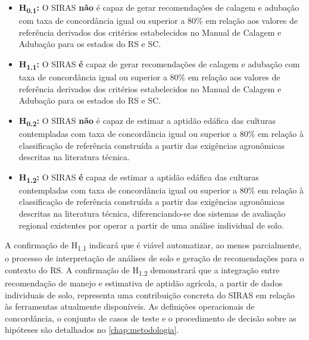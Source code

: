 \begin{itemize}

  \item \textbf{H\textsubscript{0.1}:} O SIRAS \textbf{não} é capaz de gerar
    recomendações de calagem e adubação com taxa de concordância igual ou
    superior a 80\% em relação aos valores de referência derivados dos
    critérios estabelecidos no Manual de Calagem e Adubação para os estados
    do RS e SC.

  \item \textbf{H\textsubscript{1.1}:} O SIRAS \textbf{é} capaz de gerar
    recomendações de calagem e adubação com taxa de concordância igual ou
    superior a 80\% em relação aos valores de referência derivados dos
    critérios estabelecidos no Manual de Calagem e Adubação para os estados
    do RS e SC.

  \item \textbf{H\textsubscript{0.2}:} O SIRAS \textbf{não} é capaz de estimar
    a aptidão edáfica das culturas contempladas com taxa de concordância igual
    ou superior a 80\% em relação à classificação de referência construída a
    partir das exigências agronômicas descritas na literatura técnica.

  \item \textbf{H\textsubscript{1.2}:} O SIRAS \textbf{é} capaz de estimar
    a aptidão edáfica das culturas contempladas com taxa de concordância igual
    ou superior a 80\% em relação à classificação de referência construída a
    partir das exigências agronômicas descritas na literatura técnica,
    diferenciando-se dos sistemas de avaliação regional existentes por operar
    a partir de uma análise individual de solo.

\end{itemize}

A confirmação de H\textsubscript{1.1} indicará que é viável automatizar,
ao menos parcialmente, o processo de interpretação de análises de solo e
geração de recomendações para o contexto do RS. A confirmação de
H\textsubscript{1.2} demonstrará que a integração entre recomendação de
manejo e estimativa de aptidão agrícola, a partir de dados individuais
de solo, representa uma contribuição concreta do SIRAS em relação às
ferramentas atualmente disponíveis. As definições operacionais de
concordância, o conjunto de casos de teste e o procedimento de decisão
sobre as hipóteses são detalhados no \cref{chap:metodologia}.
